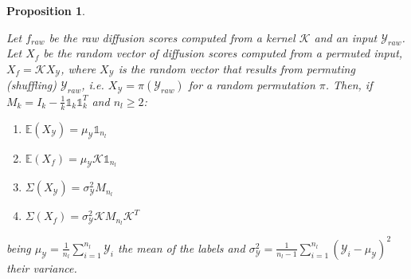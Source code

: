 \documentclass[12pt]{article}  %
\newtheorem{property}{Proposition}
\begin{document}
\begin{property}
\label{prop-moments}

Let $f_{raw}$ be the raw diffusion scores computed from a kernel $\mathcal{K}$ and an input $\mathcal{Y}_{raw}$. 
Let $X_{f}$ be the random vector of diffusion scores computed from a permuted input, $X_f = \mathcal{K} X_{\mathcal{Y}}$, where $X_{\mathcal{Y}}$ is the random vector that results from permuting (shuffling) $\mathcal{Y}_{raw}$, i.e. $X_{\mathcal{Y}} = \pi(\mathcal{Y}_{raw})$ for a random permutation $\pi$. 
Then, if $M_k = I_k - \frac{1}{k}\mathbb{1}_k\mathbb{1}_k^T$ and $n_l \geq 2$:

\begin{enumerate}[label=(\roman*)]
\item $ \mathds{E}(X_{\mathcal{Y}}) = \mu_{\mathcal{Y}}\mathbb{1}_{n_l}$
\item $ \mathds{E}(X_f) = \mu_{\mathcal{Y}} \mathcal{K} \mathbb{1}_{n_l}$
\item $ \Sigma(X_{\mathcal{Y}}) = \sigma_{\mathcal{Y}}^2 M_{n_l}$
\item $ \Sigma(X_f) = \sigma_{\mathcal{Y}}^2 \mathcal{K} M_{n_l} \mathcal{K}^T$
\end{enumerate}
being $\mu_{\mathcal{Y}} = \frac{1}{n_l}\sum_{i = 1}^{n_l}\mathcal{Y}_i$ the mean of the labels and $\sigma_{\mathcal{Y}}^2 = \frac{1}{n_l - 1}\sum_{i = 1}^{n_l} (\mathcal{Y}_i - \mu_{\mathcal{Y}})^2$ their variance.

\end{property}
\end{document}
